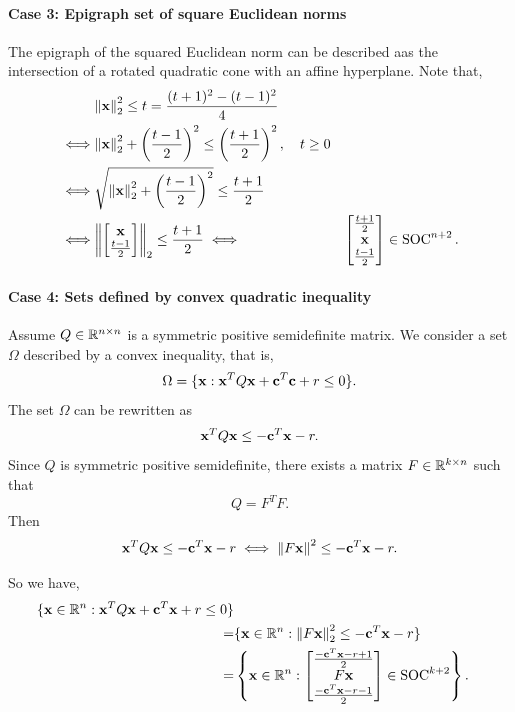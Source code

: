 \paragraph{Case 3: Epigraph set of square Euclidean norms}
The epigraph of the squared Euclidean norm can be described aas the intersection of a rotated quadratic cone with an affine hyperplane. Note that,
\begin{align*}
         & \norm{\mathbf{x}}_2^2 \leq t = \frac{(t + 1)^2 - (t - 1)^2}{4}                                             \\
    \iff & \norm{\mathbf{x}}_2^2 + \left(\frac{t - 1}{2}\right)^2 \leq \left(\frac{t + 1}{2}\right)^2, \quad t \geq 0 \\
    \iff & \sqrt{\norm{\mathbf{x}}_2^2 + \left(\frac{t - 1}{2}\right)^2} \leq \frac{t + 1}{2}                         \\
    \iff & \norm{\begin{bmatrix}\mathbf{x} \\ \frac{t - 1}{2} \end{bmatrix}}_2 \leq \frac{t + 1}{2}
    \iff & \begin{bmatrix}
        \frac{t + 1}{2} \\ \mathbf{x} \\ \frac{t - 1}{2}
    \end{bmatrix} \in \operatorname{SOC}^{n + 2}.
\end{align*}


\paragraph{Case 4: Sets defined by convex quadratic inequality}

Assume \(Q \in \mathbb{R}^{n \times n}\) is a symmetric positive semidefinite matrix. We consider a set \(\Omega\) described by a convex inequality, that is,
\[\Omega = \{\mathbf{x}: \mathbf{x}^T Q\mathbf{x} + \mathbf{c}^T \mathbf{c} + r \leq 0\}.\]
The set \(\Omega\) can be rewritten as
\[\mathbf{x}^T Q \mathbf{x} \leq -\mathbf{c}^T\mathbf{x} - r.\]
Since \(Q\) is symmetric positive semidefinite, there exists a matrix \(F \in \mathbb{R}^{k \times n}\) such that
\[Q = F^TF.\]
Then
\[\mathbf{x}^T Q\mathbf{x} \leq -\mathbf{c}^T\mathbf{x} - r \iff \norm{F\mathbf{x}}^2 \leq -\mathbf{c}^T\mathbf{x} - r.\]

So we have,
\begin{align*}
    \{\mathbf{x} \in \mathbb{R}^n : \mathbf{x}^T Q\mathbf{x} + \mathbf{c}^T \mathbf{x} + r \leq 0\}                           \\
    = & \{\mathbf{x} \in \mathbb{R}^n : \norm{F\mathbf{x}}_2^2 \leq -\mathbf{c}^T\mathbf{x} - r\}                      \\
    = & \left\{\mathbf{x} \in \mathbb{R}^n : \begin{bmatrix}
        \frac{-\mathbf{c}^T\mathbf{x} - r + 1}{2} \\ F\mathbf{x} \\ \frac{-\mathbf{c}^T\mathbf{x} - r - 1}{2}
    \end{bmatrix} \in \operatorname{SOC}^{k + 2}\right\}.
\end{align*}

